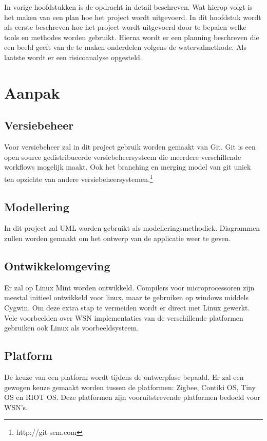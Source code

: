 
In vorige hoofdstukken is de opdracht in detail beschreven. Wat hierop volgt is het maken van een plan hoe het project wordt uitgevoerd. In dit hoofdstuk wordt als eerste beschreven hoe het project wordt uitgevoerd door te bepalen welke tools en methodes worden gebruikt. Hierna wordt er een planning beschreven die een beeld geeft van de te maken onderdelen volgens de watervalmethode. Als laatste wordt er een risicoanalyse opgesteld.

\section{Aanpak}

\subsection{Versiebeheer}
Voor versiebeheer zal in dit project gebruik worden gemaakt van Git. Git is een open source gedistribueerde versiebeheersysteem die meerdere verschillende workflows mogelijk maakt. Ook het branching en merging model van git uniek ten opzichte van andere versiebeheersystemen.\footnote{http://git-scm.com}

\subsection{Modellering}
In dit project zal UML worden gebruikt als modelleringsmethodiek. Diagrammen zullen worden gemaakt om het ontwerp van de applicatie weer te geven.

\subsection{Ontwikkelomgeving}
Er zal op Linux Mint worden ontwikkeld. Compilers voor microprocessoren zijn meestal initieel ontwikkeld voor linux, maar te gebruiken op windows middels Cygwin. Om deze extra stap te vermeiden wordt er direct met Linux gewerkt. Vele voorbeelden over WSN implementaties van de verschillende platformen gebruiken ook Linux als voorbeeldsysteem.

\subsection{Platform}
De keuze van een platform wordt tijdens de ontwerpfase bepaald. Er zal een gewogen keuze gemaakt worden tussen de platformen: Zigbee, Contiki OS, Tiny OS en RIOT OS. Deze platformen zijn vooruitstrevende platformen bedoeld voor WSN's.

